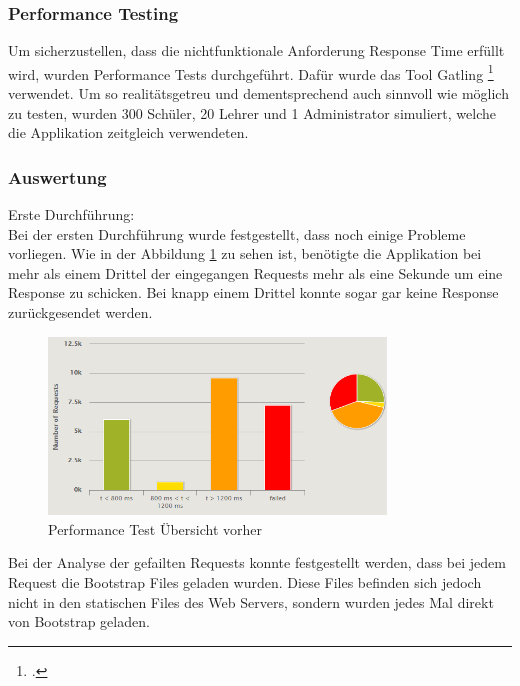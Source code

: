 \newpage

\subsubsection{Performance Testing}
\label{chapter_performance_tests}
Um sicherzustellen, dass die nichtfunktionale Anforderung Response Time erfüllt wird, wurden Performance Tests durchgeführt. Dafür wurde das Tool Gatling \footcite{performance_tests} verwendet. Um so realitätsgetreu und dementsprechend auch sinnvoll wie möglich zu testen, wurden 300 Schüler, 20 Lehrer und 1 Administrator simuliert, welche die Applikation zeitgleich verwendeten. \\

\subsubsection*{Auswertung}
Erste Durchführung: \\
Bei der ersten Durchführung wurde festgestellt, dass noch einige Probleme vorliegen. Wie in der Abbildung \ref{performance_tests_vorher} zu sehen ist, benötigte die Applikation bei mehr als einem Drittel der eingegangen Requests mehr als eine Sekunde um eine Response zu schicken. Bei knapp einem Drittel konnte sogar gar keine Response zurückgesendet werden.

	\begin{figure}[H]
		\begin{center}
		\includegraphics[width=0.8\textwidth, height=\textheight, keepaspectratio]{images/performance_uebersicht_vorher.png}
		\caption{Performance Test Übersicht vorher}
			\label{performance_tests_vorher}
	\end{center}
	\end{figure}
	
Bei der Analyse der gefailten Requests konnte festgestellt werden, dass bei jedem Request die Bootstrap Files geladen wurden. Diese Files befinden sich jedoch nicht in den statischen Files des Web Servers, sondern wurden jedes Mal direkt von Bootstrap geladen. \\

